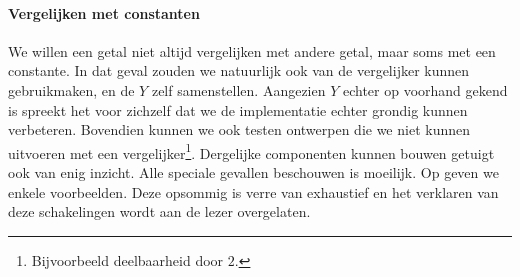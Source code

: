 \paragraph{Vergelijken met constanten}
We willen een getal niet altijd vergelijken met andere getal, maar soms met een constante. In dat geval zouden we natuurlijk ook van de vergelijker kunnen gebruikmaken, en de $Y$ zelf samenstellen. Aangezien $Y$ echter op voorhand gekend is spreekt het voor zichzelf dat we de implementatie echter grondig kunnen verbeteren. Bovendien kunnen we ook testen ontwerpen die we niet kunnen uitvoeren met een vergelijker\footnote{Bijvoorbeeld deelbaarheid door $2$.}. Dergelijke componenten kunnen bouwen getuigt ook van enig inzicht. Alle speciale gevallen beschouwen is moeilijk. Op  geven we enkele voorbeelden. Deze opsommig is verre van exhaustief en het verklaren van deze schakelingen wordt aan de lezer overgelaten.

